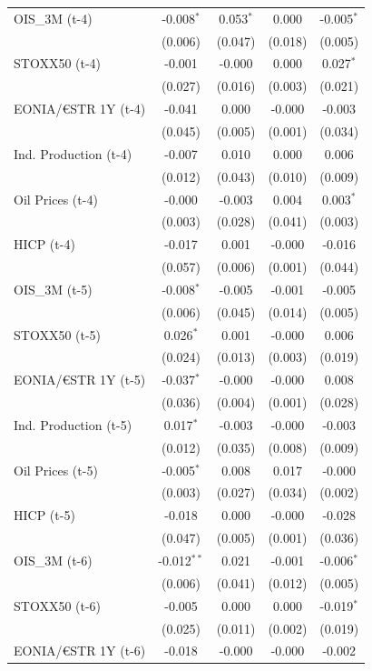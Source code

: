 \begin{longtable}[t]{lcccc}
OIS\_3M (t-4) & -0.008$^{*}$ & 0.053$^{*}$ & 0.000 & -0.005$^{*}$\\
 & (0.006) & (0.047) & (0.018) & (0.005)\\
STOXX50 (t-4) & -0.001 & -0.000 & 0.000 & 0.027$^{*}$\\
 & (0.027) & (0.016) & (0.003) & (0.021)\\
EONIA/€STR 1Y (t-4) & -0.041 & 0.000 & -0.000 & -0.003\\
 & (0.045) & (0.005) & (0.001) & (0.034)\\
Ind. Production (t-4) & -0.007 & 0.010 & 0.000 & 0.006\\
 & (0.012) & (0.043) & (0.010) & (0.009)\\
Oil Prices (t-4) & -0.000 & -0.003 & 0.004 & 0.003$^{*}$\\
 & (0.003) & (0.028) & (0.041) & (0.003)\\
HICP (t-4) & -0.017 & 0.001 & -0.000 & -0.016\\
 & (0.057) & (0.006) & (0.001) & (0.044)\\
OIS\_3M (t-5) & -0.008$^{*}$ & -0.005 & -0.001 & -0.005\\
 & (0.006) & (0.045) & (0.014) & (0.005)\\
STOXX50 (t-5) & 0.026$^{*}$ & 0.001 & -0.000 & 0.006\\
 & (0.024) & (0.013) & (0.003) & (0.019)\\
EONIA/€STR 1Y (t-5) & -0.037$^{*}$ & -0.000 & -0.000 & 0.008\\
 & (0.036) & (0.004) & (0.001) & (0.028)\\
Ind. Production (t-5) & 0.017$^{*}$ & -0.003 & -0.000 & -0.003\\
 & (0.012) & (0.035) & (0.008) & (0.009)\\
Oil Prices (t-5) & -0.005$^{*}$ & 0.008 & 0.017 & -0.000\\
 & (0.003) & (0.027) & (0.034) & (0.002)\\
HICP (t-5) & -0.018 & 0.000 & -0.000 & -0.028\\
 & (0.047) & (0.005) & (0.001) & (0.036)\\
OIS\_3M (t-6) & -0.012$^{**}$ & 0.021 & -0.001 & -0.006$^{*}$\\
 & (0.006) & (0.041) & (0.012) & (0.005)\\
STOXX50 (t-6) & -0.005 & 0.000 & 0.000 & -0.019$^{*}$\\
 & (0.025) & (0.011) & (0.002) & (0.019)\\
EONIA/€STR 1Y (t-6) & -0.018 & -0.000 & -0.000 & -0.002\\

\end{longtable}
